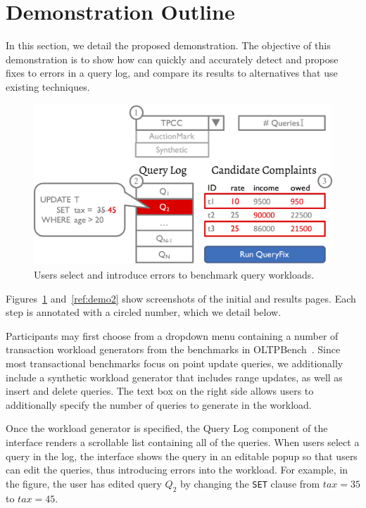 \section{Demonstration Outline}
\label{sec:demo}

In this section, we detail the proposed demonstration. The objective
of this demonstration is to show how \sys can quickly and accurately detect 
and propose fixes to errors in a query log, and compare its results to alternatives
that use existing techniques.


\begin{figure}[h]
\centering
  \includegraphics[width = .85\columnwidth]{figures/demo1}
  \caption{Users select and introduce errors to benchmark query workloads.}
  \label{f:demo1} 
\end{figure}

Figures~\ref{f:demo1} and~\ref{ref:demo2} show screenshots of the initial and results pages.
Each step is annotated with a circled number, which we detail below.

 Participants may first choose from a dropdown menu containing
a number of transaction workload generators from the benchmarks in OLTPBench~\cite{oltpbench}.
Since most transactional benchmarks focus on point update queries, we additionally include a 
synthetic workload generator that includes range updates, as well as insert and delete queries.
The text box on the right side allows users to additionally specify the number of queries to generate
in the workload.  

 Once the workload generator is specified, the Query Log component of the interface
renders a scrollable list containing all of the queries.  When users select a query in the log,
the interface shows the query in an editable popup so that users can edit the queries, thus introducing errors
into the workload.  For example, in the figure, the user has edited query $Q_2$ by changing the \texttt{SET}
clause from $tax = 35$ to $tax = 45$.

